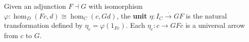 Given an adjunction $F \dashv G$ with isomorphism $\varphi: \hom_D(Fc, d) \cong \hom_C(c, Gd)$, the \textbf{unit} $\eta: I_C \xrightarrow{\cdot} GF$ is the natural transformation defined by $\eta_c = \varphi(1_{Fc})$. Each $\eta_c: c \rightarrow GFc$ is a universal arrow from $c$ to $G$.